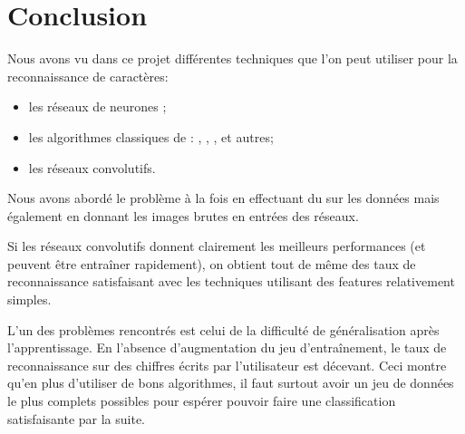 
\chapter{Conclusion}

Nous avons vu dans ce projet différentes techniques que l'on peut utiliser 
pour la reconnaissance de caractères:
\begin{itemize}
  \item les réseaux de neurones ;
  \item les algorithmes classiques de  : , , , et autres;
  \item les réseaux convolutifs.
\end{itemize}

Nous avons abordé le problème à la fois en effectuant du  sur 
les données mais également en donnant les images brutes en entrées des réseaux. 

Si les réseaux convolutifs donnent clairement les meilleurs performances 
(et peuvent être entraîner rapidement), on obtient tout de même des taux 
de reconnaissance satisfaisant avec les techniques utilisant des features
relativement simples.

L'un des problèmes rencontrés est celui de la difficulté de généralisation 
après l'apprentissage.
En l'absence d'augmentation du jeu d'entraînement, le taux de reconnaissance 
sur des chiffres écrits par l'utilisateur est décevant.
Ceci montre qu'en plus d'utiliser de bons algorithmes, il faut surtout avoir 
un jeu de données le plus complets possibles pour espérer pouvoir faire 
une classification satisfaisante par la suite.


